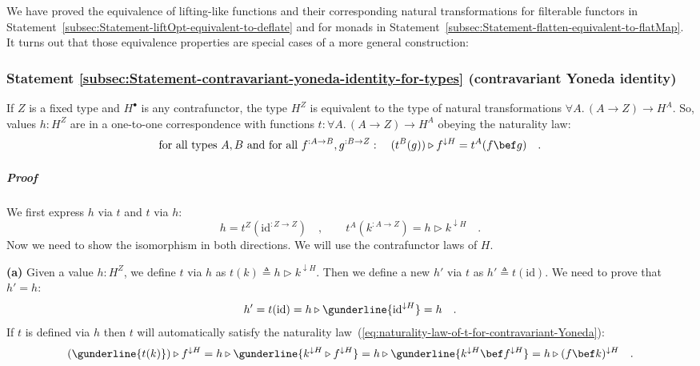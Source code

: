 We have proved the equivalence of lifting-like functions and their
corresponding natural transformations for filterable functors in Statement~\ref{subsec:Statement-liftOpt-equivalent-to-deflate}
and for monads in Statement~\ref{subsec:Statement-flatten-equivalent-to-flatMap}.
It turns out that those equivalence properties are special cases of
a more general construction:

\subsubsection{Statement \label{subsec:Statement-contravariant-yoneda-identity-for-types}\ref{subsec:Statement-contravariant-yoneda-identity-for-types}
(contravariant Yoneda identity)}

If $Z$ is a fixed type and $H^{\bullet}$ is any contrafunctor, the
type $H^{Z}$ is equivalent to the type of natural transformations
$\forall A.\,(A\rightarrow Z)\rightarrow H^{A}$. So, values $h:H^{Z}$
are in a one-to-one correspondence with functions $t:\forall A.\,(A\rightarrow Z)\rightarrow H^{A}$
obeying the naturality law:
\begin{equation}
\text{for all types }A,B\text{ and for all }f^{:A\rightarrow B},g^{:B\rightarrow Z}:\quad(t^{B}(g))\triangleright f^{\downarrow H}=t^{A}(f\bef g)\quad.\label{eq:naturality-law-of-t-for-contravariant-Yoneda}
\end{equation}
 

\subparagraph{Proof}

We first express $h$ via $t$ and $t$ via $h$:
\[
h=t^{Z}(\text{id}^{:Z\rightarrow Z})\quad,\quad\quad t^{A}(k^{:A\rightarrow Z})=h\triangleright k^{\downarrow H}\quad.
\]
 Now we need to show the isomorphism in both directions. We will use
the contrafunctor laws of $H$.

\textbf{(a)} Given a value $h:H^{Z}$, we define $t$ via $h$ as
$t(k)\triangleq h\triangleright k^{\downarrow H}$. Then we define
a new $h'$ via $t$ as $h'\triangleq t(\text{id})$. We need to prove
that $h'=h$:
\[
h'=t(\text{id})=h\triangleright\gunderline{\text{id}^{\downarrow H}}=h\quad.
\]
If $t$ is defined via $h$ then $t$ will automatically satisfy the
naturality law~(\ref{eq:naturality-law-of-t-for-contravariant-Yoneda}):
\[
(\gunderline{t(k)})\triangleright f^{\downarrow H}=h\triangleright\gunderline{k^{\downarrow H}\triangleright f^{\downarrow H}}=h\triangleright\gunderline{k^{\downarrow H}\bef f^{\downarrow H}}=h\triangleright(f\bef k)^{\downarrow H}\quad.
\]

